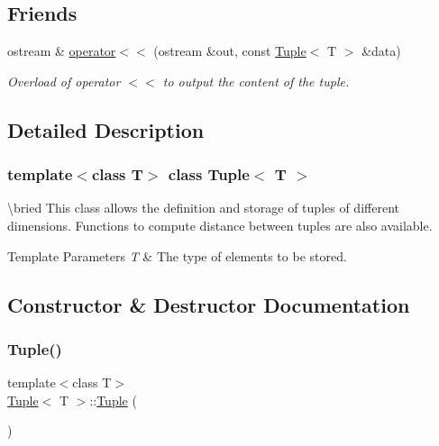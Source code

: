 \subsection*{Friends}
\begin{DoxyCompactItemize}
\item 
ostream \& \mbox{\hyperlink{class_tuple_a2e6e2a2521038ab827ff2aa73023a53d}{operator$<$$<$}} (ostream \&out, const \mbox{\hyperlink{class_tuple}{Tuple}}$<$ T $>$ \&data)
\begin{DoxyCompactList}\small\item\em Overload of operator $<$$<$ to output the content of the tuple. \end{DoxyCompactList}\end{DoxyCompactItemize}


\subsection{Detailed Description}
\subsubsection*{template$<$class T$>$\newline
class Tuple$<$ T $>$}

\textbackslash{}bried This class allows the definition and storage of tuples of different dimensions. Functions to compute distance between tuples are also available. 
\begin{DoxyTemplParams}{Template Parameters}
{\em T} & The type of elements to be stored. \\
\hline
\end{DoxyTemplParams}


\subsection{Constructor \& Destructor Documentation}
\mbox{\label{class_tuple_ae8bde0e2215d6d5235a2a45195f7bfae}} 
\subsubsection{\texorpdfstring{Tuple()}{Tuple()}\hspace{0.1cm}{\footnotesize\ttfamily [1/2]}}
{\footnotesize\ttfamily template$<$class T$>$ \\
\mbox{\hyperlink{class_tuple}{Tuple}}$<$ T $>$\+::\mbox{\hyperlink{class_tuple}{Tuple}} (\begin{DoxyParamCaption}{ }\end{DoxyParamCaption})\hspace{0.3cm}{\ttfamily [inline]}}



